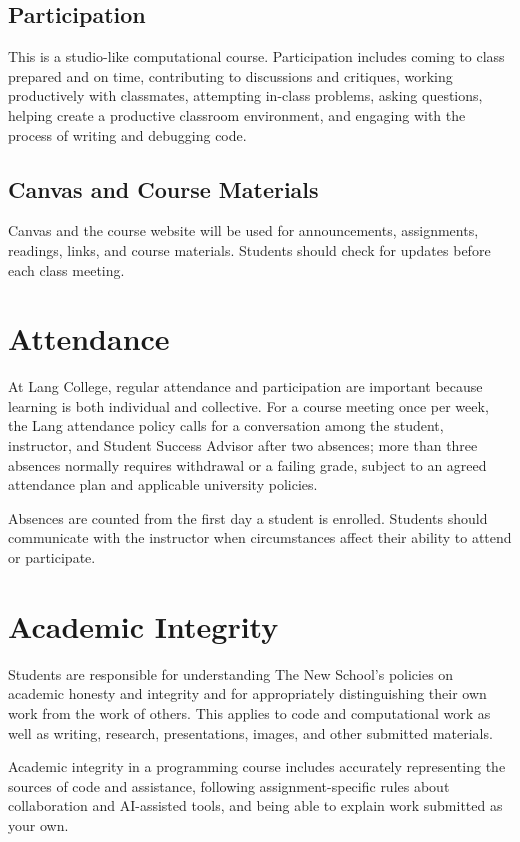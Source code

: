\documentclass[11pt]{article}
\begin{document}
\subsection{Participation}

This is a studio-like computational course. Participation includes coming to
class prepared and on time, contributing to discussions and critiques,
working productively with classmates, attempting in-class problems, asking
questions, helping create a productive classroom environment, and engaging
with the process of writing and debugging code.

\subsection{Canvas and Course Materials}

Canvas and the course website will be used for announcements, assignments,
readings, links, and course materials. Students should check for updates
before each class meeting.

\section{Attendance}

At Lang College, regular attendance and participation are important because
learning is both individual and collective. For a course meeting once per
week, the Lang attendance policy calls for a conversation among the student,
instructor, and Student Success Advisor after two absences; more than three
absences normally requires withdrawal or a failing grade, subject to an
agreed attendance plan and applicable university policies.

Absences are counted from the first day a student is enrolled. Students
should communicate with the instructor when circumstances affect their
ability to attend or participate.

\section{Academic Integrity}

Students are responsible for understanding The New School's policies on
academic honesty and integrity and for appropriately distinguishing their own
work from the work of others. This applies to code and computational work as
well as writing, research, presentations, images, and other submitted
materials.

Academic integrity in a programming course includes accurately representing
the sources of code and assistance, following assignment-specific rules about
collaboration and AI-assisted tools, and being able to explain work submitted
as your own.
\end{document}
